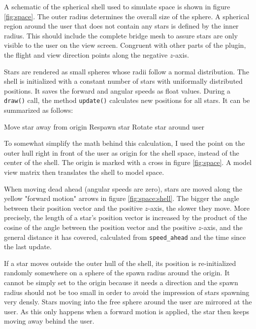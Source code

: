 \documentclass[hyperref, bachelorofscience]{cgvpub}
\begin{document}
A schematic of the spherical shell used to simulate space is shown in figure \ref{fig:space}. The outer radius determines the overall size of the sphere. A spherical region around the user that does not contain any stars is defined by the inner radius. This should include the complete bridge mesh to assure stars are only visible to the user on the view screen. Congruent with other parts of the plugin, the flight and view direction points along the negative $ z $-axis. 

Stars are rendered as small spheres whose radii follow a normal distribution. The shell is initialized with a constant number of stars with uniformally distributed positions. It saves the forward and angular speeds as float values. During a \lstinline|draw()| call, the method \lstinline|update()| calculates new positions for all stars. It can be summarized as follows:

\begin{algorithmic}
		\State Move star away from origin
			\State Respawn star
		\Else
			\State Rotate star around user
		\EndIf
	\EndFor
\end{algorithmic}

To somewhat simplify the math behind this calculation, I used the point on the outer hull right in front of the user as origin for the shell space, instead of the center of the shell. The origin is marked with a cross in figure \ref{fig:space}. A model view matrix then translates the shell to model space. 

When moving dead ahead (angular speeds are zero), stars are moved along the yellow "forward motion" arrows in figure \ref{fig:space:shell}. The bigger the angle between their position vector and the positive $ z $-axis, the slower they move. More precisely, the length of a star's position vector is increased by the product of the cosine of the angle between the position vector and the positive $ z $-axis, and the general distance it has covered, calculated from \lstinline|speed_ahead| and the time since the last update.

If a star moves outside the outer hull of the shell, its position is re-initialized randomly somewhere on a sphere of the spawn radius around the origin. It cannot be simply set to the origin because it needs a direction and the spawn radius should not be too small in order to avoid the impression of stars spawning very densly. Stars moving into the free sphere around the user are mirrored at the user. As this only happens when a forward motion is applied, the star then keeps moving away behind the user.
\end{document}
